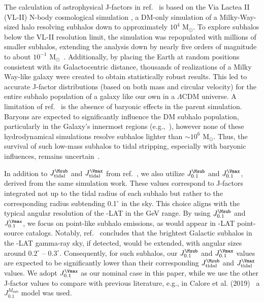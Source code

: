 The calculation of astrophysical J-factors in ref.~\cite{2024MNRAS.530.2496A} is based on the Via Lactea II (VL-II) N-body cosmological simulation \cite{2007ApJ...667..859D}, a DM-only simulation of a Milky-Way-sized halo resolving subhalos down to approximately $10^4$ $\textrm{M}_{\odot}$. 
To explore subhalos below the VL-II resolution limit, 
the simulation was repopulated with millions of smaller subhalos, extending the analysis down by nearly five orders of magnitude 
to about $10^{-1}$ $\textrm{M}_{\odot}$~\cite{2022PhRvD.105h3006C}.
Additionally, by placing the Earth at random positions consistent with its Galactocentric distance, 
thousands of realizations of a Milky Way-like galaxy were created to obtain statistically robust results. 
This led to accurate J-factor distributions (based on both mass and circular velocity) for the entire subhalo population of a galaxy like our own in a $\Lambda$CDM universe. A limitation of ref.~\cite{2024MNRAS.530.2496A} is the absence of baryonic effects in the parent simulation. Baryons are expected to significantly influence the DM subhalo population, particularly in the Galaxy's innermost regions (e.g.,~\cite{2019MNRAS.487.4409K,2017MNRAS.471.1709G,2021MNRAS.501.3558G}), however none of these hydrodynamical simulations resolve subhalos lighter than $\sim 10^6$ $\textrm{M}_{\odot}$. Thus, the survival of such low-mass subhalos to tidal stripping, especially with baryonic influences, remains uncertain~\cite{2018MNRAS.474.3043V,2020MNRAS.491.4591E,2023MNRAS.518...93A}.

In addition to $J_\textrm{tidal}^{\Msub}$ and $J_\textrm{tidal}^{\Vmax}$ from ref.~\cite{2024MNRAS.530.2496A}, we also utilize $J_{0.1}^{\Msub}$ and $J_{0.1}^{\Vmax}$, derived from the same simulation work. These values correspond to J-factors integrated not up to the tidal radius of each subhalo but rather to the corresponding radius subtending 0.1$^\circ$ in the sky. 
This choice aligns with the typical angular resolution of the {\Fermi}-LAT in the GeV range. By using $J_{0.1}^{\Msub}$ and $J_{0.1}^{\Vmax}$, we focus on point-like subhalo emissions, as would appear in \Fermi-LAT point-source catalogs. 
Notably, ref.~\cite{2022PhRvD.105h3006C} concludes that the brightest Galactic subhalos in the \Fermi-LAT gamma-ray sky, if detected, would be extended, with angular sizes around $0.2^\circ$ – $0.3^\circ$. 
Consequently, for such subhalos, our $J_{0.1}^{\Msub}$ and $J_{0.1}^{\Vmax}$ values are expected to be significantly lower than their corresponding $J_\textrm{tidal}^{\Msub}$ and $J_\textrm{tidal}^{\Vmax}$ values. 
We adopt $J_{0.1}^{\Vmax}$ as our nominal case in this paper, while we use the other J-factor values to compare with previous literature, e.g., in Calore et al. (2019)~\cite{2019Galax...7...90C} a $J_{0.1}^{M_\textrm{sub}}$ model was used.

